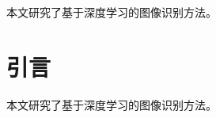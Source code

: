 \documentclass{sduthesis}
\begin{document}
\MakeCover

\begin{cnabstract}
  本文研究了基于深度学习的图像识别方法。
\end{cnabstract}

\chapter{引言}
本文研究了基于深度学习的图像识别方法。
\end{document}
